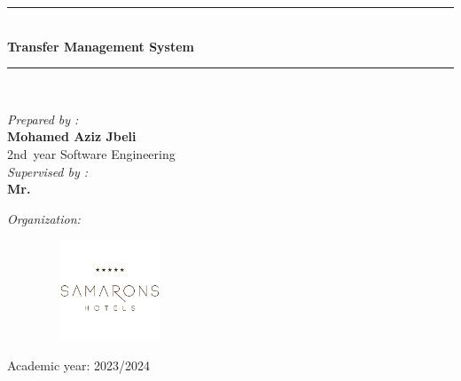 \begin{titlepage}
\begin{center}
\rule{\linewidth}{0.5mm} \\[0.5cm]
{ \huge \bfseries 
Transfer Management System 
}
\rule{\linewidth}{0.5mm} \\[0.5cm]

\noindent
\begin{center}\large
    \emph{ Prepared by :}\\[0.5cm]
  \textbf{Mohamed Aziz Jbeli}  \\[0.5cm]      {\large 2nd~year Software Engineering }\\[0.5cm] 
 \bigskip 
  \emph{Supervised by : }\\[0.5cm]
  \textbf{Mr. }
\bigskip    
\bigskip
\bigskip

  \emph{Organization:}\\[0.5cm]
  \begin{figure}[H]
   \centering
    \includegraphics[width=4.0cm,height=3.0cm]{images/hotel.png}
\end{figure}

\vfill {\small Academic year: 2023/2024}\\
\end{center}



\end{center}

\end{titlepage}

